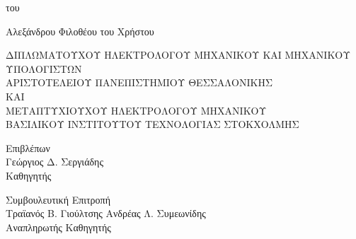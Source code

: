 \begin{center}
   {του}

   \vspace{0.5cm}

   {Αλεξάνδρου Φιλοθέου του Χρήστου}

   \vspace{0.5cm}

   {\footnotesize ΔΙΠΛΩΜΑΤΟΥΧΟΥ ΗΛΕΚΤΡΟΛΟΓΟΥ ΜΗΧΑΝΙΚΟΥ ΚΑΙ ΜΗΧΑΝΙΚΟΥ ΥΠΟΛΟΓΙΣΤΩΝ\\}
   {\footnotesize ΑΡΙΣΤΟΤΕΛΕΙΟΥ ΠΑΝΕΠΙΣΤΗΜΙΟΥ ΘΕΣΣΑΛΟΝΙΚΗΣ\\}
   {\footnotesize ΚΑΙ\\}
   {\footnotesize ΜΕΤΑΠΤΥΧΙΟΥΧΟΥ ΗΛΕΚΤΡΟΛΟΓΟΥ ΜΗΧΑΝΙΚΟΥ\\}
   {\footnotesize ΒΑΣΙΛΙΚΟΥ ΙΝΣΤΙΤΟΥΤΟΥ ΤΕΧΝΟΛΟΓΙΑΣ ΣΤΟΚΧΟΛΜΗΣ\\}

   \vspace{2.3cm}

   {Επιβλέπων\\}
   \vspace{-0.2cm}
   {Γεώργιος Δ. Σεργιάδης\\}
   \vspace{-0.2cm}
   {Καθηγητής}

   \vspace{1cm}

   {Συμβουλευτική Επιτροπή\\}
   {Τραϊανός Β. Γιούλτσης} \hspace{5cm} {Ανδρέας Λ. Συμεωνίδης\\}
   \vspace{-0.2cm}
   \hspace{1.2cm}{Καθηγητής}             \hspace{5.8cm} {Αναπληρωτής Καθηγητής}

\end{center}
